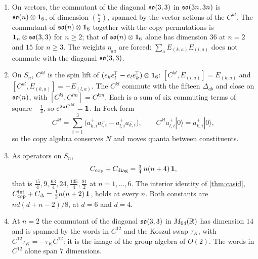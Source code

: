 \begin{theorem}
\label{e3:thm:dual}
\begin{enumerate}[label=(\roman*),leftmargin=2.2em]
\item On vectors, the commutant of the diagonal $\mathfrak{so}(3,3)$ in $\mathfrak{so}(3n,3n)$ is $\mathfrak{so}(n)\otimes\mathbf 1_6$, of dimension $\binom n2$, spanned by the vector
actions of the $C^{kl}$. The commutant of $\mathfrak{so}(n)\otimes\mathbf 1_6$ together with the copy permutations is $\mathbf 1_n\otimes\mathfrak{so}(3,3)$ for $n\ge2$; that of
$\mathfrak{so}(n)\otimes\mathbf 1_6$ alone has dimension $36$ at $n=2$ and $15$ for $n\ge3$. The weights $\eta_{aa}$ are forced: $\sum_aE_{(k,a)}E_{(l,a)}$ does not commute
with the diagonal $\mathfrak{so}(3,3)$.
\item On $S_n$, $C^{kl}$ is the spin lift of $(e_ke_l^{\!\top}-e_le_k^{\!\top})\otimes\mathbf 1_6$: $[C^{kl},E_{(l,a)}]=E_{(k,a)}$ and $[C^{kl},E_{(k,a)}]=-E_{(l,a)}$. The
$C^{kl}$ commute with the fifteen $\Delta_{ab}$ and close on $\mathfrak{so}(n)$, with $[C^{kl},C^{lm}]=C^{km}$. Each is a sum of six commuting terms of square
$-\tfrac14$, so $e^{2\pi C^{kl}}=\mathbf 1$. In Fock form
\[
C^{kl}=\sum_{i=1}^3\bigl(a^+_{k,i}a^-_{l,i}-a^+_{l,i}a^-_{k,i}\bigr),\qquad C^{kl}a^+_{l,i}|0\rangle=a^+_{k,i}|0\rangle,
\]
so the copy algebra conserves $N$ and moves quanta between constituents.
\item As operators on $S_n$,
\[
C_{\rm cop}+C_{\rm diag}=\tfrac34\,n(n+4)\,\mathbf 1,
\]
that is $\tfrac{15}4,9,\tfrac{63}4,24,\tfrac{135}4,\tfrac{81}2$ at $n=1,\dots,6$. The interior identity of \cref{thm:casid},
$C^{\rm int}_{\rm cop}+C_\Delta=\tfrac12 n(n+2)\,\mathbf 1$, holds at every $n$. Both constants are $nd(d+n-2)/8$, at $d=6$ and $d=4$.
\item At $n=2$ the commutant of the diagonal $\mathfrak{so}(3,3)$ in $M_{64}(\mathbb{R})$ has dimension $14$ and is spanned by the words in $C^{12}$ and the Koszul
swap $\tau_K$, with $C^{12}\tau_K=-\tau_KC^{12}$: it is the image of the group algebra of $O(2)$. The words in $C^{12}$ alone span $7$ dimensions.
\end{enumerate}
\end{theorem}

